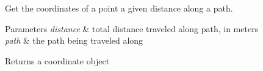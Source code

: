 Get the coordinates of a point a given distance along a path. 
\begin{DoxyParams}{Parameters}
{\em distance} & total distance traveled along path, in meters \\
\hline
{\em path} & the path being traveled along \\
\hline
\end{DoxyParams}
\begin{DoxyReturn}{Returns}
a coordinate object 
\end{DoxyReturn}
